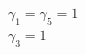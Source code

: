 \documentclass[preview]{standalone}
\begin{document}
\begin{center}
$\gamma_1 = \gamma_5 = 1$\\$\gamma_3 = 1$
\end{center}
\end{document}
